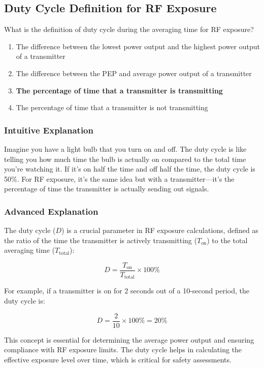 \subsection{Duty Cycle Definition for RF Exposure}
\label{T0C11}

\begin{tcolorbox}[colback=gray!10!white,colframe=black!75!black,title=T0C11]
What is the definition of duty cycle during the averaging time for RF exposure?
\begin{enumerate}[label=\Alph*)]
    \item The difference between the lowest power output and the highest power output of a transmitter
    \item The difference between the PEP and average power output of a transmitter
    \item \textbf{The percentage of time that a transmitter is transmitting}
    \item The percentage of time that a transmitter is not transmitting
\end{enumerate}
\end{tcolorbox}

\subsubsection{Intuitive Explanation}
Imagine you have a light bulb that you turn on and off. The duty cycle is like telling you how much time the bulb is actually on compared to the total time you’re watching it. If it’s on half the time and off half the time, the duty cycle is 50\%. For RF exposure, it’s the same idea but with a transmitter—it’s the percentage of time the transmitter is actually sending out signals.

\subsubsection{Advanced Explanation}
The duty cycle (\(D\)) is a crucial parameter in RF exposure calculations, defined as the ratio of the time the transmitter is actively transmitting (\(T_{\text{on}}\)) to the total averaging time (\(T_{\text{total}}\)):

\[
D = \frac{T_{\text{on}}}{T_{\text{total}}} \times 100\%
\]

For example, if a transmitter is on for 2 seconds out of a 10-second period, the duty cycle is:

\[
D = \frac{2}{10} \times 100\% = 20\%
\]

This concept is essential for determining the average power output and ensuring compliance with RF exposure limits. The duty cycle helps in calculating the effective exposure level over time, which is critical for safety assessments.

